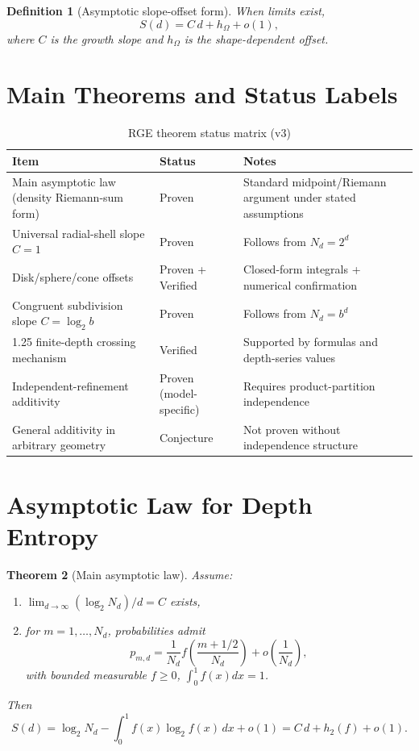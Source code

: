 \documentclass[11pt,a4paper]{article}
\newtheorem{theorem}{Theorem}[section]
\newtheorem{definition}[theorem]{Definition}
\begin{document}
\begin{definition}[Asymptotic slope-offset form]
When limits exist,
\[
S(d)=C\,d+h_\Omega+o(1),
\]
where $C$ is the growth slope and $h_\Omega$ is the shape-dependent offset.
\end{definition}

\section{Main Theorems and Status Labels}
\begin{table}[h]
\centering
\caption{RGE theorem status matrix (v3)}
\begin{tabular}{@{}lll@{}}
\toprule
\textbf{Item} & \textbf{Status} & \textbf{Notes} \\
\midrule
Main asymptotic law (density Riemann-sum form) & Proven & Standard midpoint/Riemann argument under stated assumptions \\
Universal radial-shell slope $C=1$ & Proven & Follows from $N_d=2^d$ \\
Disk/sphere/cone offsets & Proven + Verified & Closed-form integrals + numerical confirmation \\
Congruent subdivision slope $C=\log_2 b$ & Proven & Follows from $N_d=b^d$ \\
1.25 finite-depth crossing mechanism & Verified & Supported by formulas and depth-series values \\
Independent-refinement additivity & Proven (model-specific) & Requires product-partition independence \\
General additivity in arbitrary geometry & Conjecture & Not proven without independence structure \\
\bottomrule
\end{tabular}
\end{table}

\section{Asymptotic Law for Depth Entropy}
\begin{theorem}[Main asymptotic law]
Assume:
\begin{enumerate}
    \item $\lim_{d\to\infty} (\log_2 N_d)/d = C$ exists,
    \item for $m=1,\dots,N_d$, probabilities admit
    \[
    p_{m,d}=\frac{1}{N_d}f\!\left(\frac{m+1/2}{N_d}\right)+o\!\left(\frac{1}{N_d}\right),
    \]
    with bounded measurable $f\ge0$, $\int_0^1 f(x)dx=1$.
\end{enumerate}
Then
\[
S(d)=\log_2 N_d-\int_0^1 f(x)\log_2 f(x)\,dx + o(1)
= C\,d + h_2(f) + o(1).
\]
\end{theorem}
\end{document}
